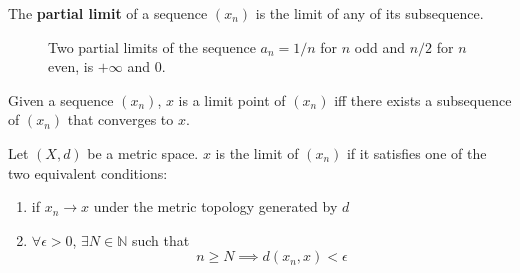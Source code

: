   \begin{definition}
    The \textbf{partial limit} of a sequence $(x_n)$ is the limit of any of its subsequence.  

    \begin{figure}[H]
      \centering 
      \caption{Two partial limits of the sequence $a_n = 1/n$ for $n$ odd and $n/2$ for $n$ even, is $+\infty$ and $0$. } 
      \label{fig:partial_limit}
    \end{figure}
  \end{definition}

  \begin{lemma}
    Given a sequence $(x_n)$, $x$ is a limit point of $(x_n)$ iff there exists a subsequence of $(x_n)$ that converges to $x$. 
  \end{lemma}

  \begin{definition}
    Let $(X, d)$ be a metric space. $x$ is the limit of $(x_n)$ if it satisfies one of the two equivalent conditions: 
    \begin{enumerate}
      \item if $x_n \to x$ under the metric topology generated by $d$
      \item $\forall \epsilon > 0$, $\exists N \in \mathbb{N}$ such that
      \begin{equation}
        n \geq N \implies d(x_n, x) < \epsilon 
      \end{equation}
    \end{enumerate}
  \end{definition}


